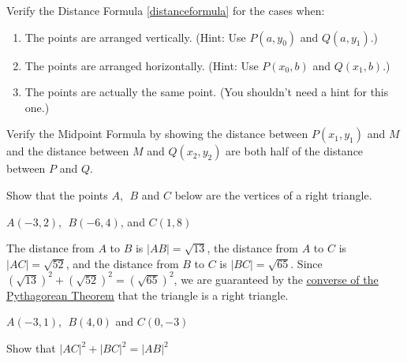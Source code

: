 \documentclass{ximera}
\begin{document}
\begin{problem}\label{distanceothercases} Verify the Distance Formula \ref{distanceformula} for the cases when:

\begin{enumerate}

\item The points are arranged vertically.  (Hint: Use $P(a, y_0)$ and $Q(a, y_1)$.)
\item The points are arranged horizontally. (Hint: Use $P(x_0, b)$ and $Q(x_1, b)$.)
\item The points are actually the same point. (You shouldn't need a hint for this one.)

\end{enumerate}
\end{problem}

\begin{problem}\label{verifymidpointformula} 
Verify the Midpoint Formula by showing the distance between $P(x_1, y_1)$ and $M$ and the distance between $M$ and $Q(x_2, y_2)$ are both half of the distance between $P$ and $Q$. 
\end{problem}

\begin{question}
Show that the points $A$, $\;B$ and $C$ below are the vertices of a right triangle.

\begin{problem}
      $A(-3,2)$, $\;B(-6,4)$, and $C(1,8)$

\begin{solution}
     The distance from $A$ to $B$ is $|AB| = \sqrt{13}$, the distance from $A$ to $C$ is $|AC| = \sqrt{52}$, and the distance from $B$ to $C$ is $|BC| = \sqrt{65}$.  Since $\left(\sqrt{13}\right)^2 + \left( \sqrt{52} \right)^2 = \left( \sqrt{65} \right)^2$, we are guaranteed by the \href{http://en.wikipedia.org/wiki/Pythagorean_theorem#Converse}{\underline{converse of the Pythagorean Theorem}} that the triangle is a right triangle.
\end{solution}
      
\end{problem}

\begin{problem}
       $A(-3, 1)$, $\;B(4, 0)$ and $C(0, -3)$
\begin{hint}
    Show that $|AC|^{2} + |BC|^{2} = |AB|^{2}$
\end{hint}
       
\end{problem}

\end{question}
\end{document}
